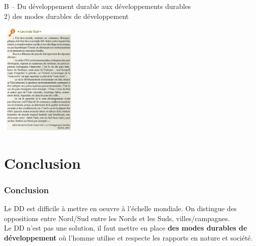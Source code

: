 \documentclass[C]{beamer}
\begin{document}
		\begin{frame}{B -- Du développement durable aux développements durables\\ 2) des modes durables de développement}
		\begin{center}
		\includegraphics[height=5.5cm]{images/carte_1_18.jpg}
		\end{center}
		\end{frame}
	
	\section*{Conclusion}
	\begin{frame}
	\frametitle{Conclusion}
	Le DD est difficile à mettre en oeuvre à l'échelle mondiale. On distingue des oppositions entre Nord/Sud entre les Nords et les Suds, villes/campagnes.\\
	Le DD n'est pas une solution, il faut mettre en place \textbf{des modes durables de développement} où l'homme utilise et respecte les rapports en nature et société.
	\end{frame}
\end{document}
